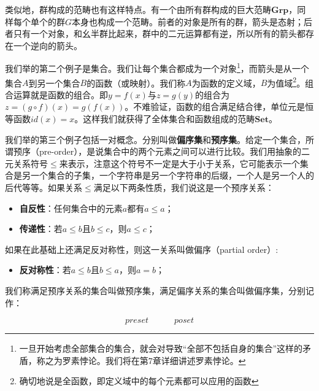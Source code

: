 \documentclass{article}
\begin{document}
类似地，群构成的范畴也有这样特点。有一个由所有群构成的巨大范畴$\pmb{Grp}$，同样每个单个的群$G$本身也构成一个范畴。前者的对象是所有的群，箭头是态射；后者只有一个对象，和幺半群比起来，群中的二元运算都有逆，所以所有的箭头都存在一个逆向的箭头。

我们举的第二个例子是集合。我们让每个集合都成为一个对象\footnote{一旦开始考虑全部集合的集合，就会对导致“全部不包括自身的集合”这样的矛盾，称之为罗素悖论。我们将在第7章详细讲述罗素悖论。}，而箭头是从一个集合$A$到另一个集合$B$的函数（或映射）。我们称$A$为函数的定义域，$B$为值域\footnote{确切地说是全函数，即定义域中的每个元素都可以应用的函数}。组合运算就是函数的组合。即$y = f(x)$与$z = g(y)$的组合为$z = (g \circ f)(x) = g(f(x))$。不难验证，函数的组合满足结合律，单位元是恒等函数$id(x) = x$。这样我们就获得了全体集合和函数组成的范畴$\pmb{Set}$。

我们举的第三个例子包括一对概念。分别叫做\textbf{偏序集}和\textbf{预序集}。给定一个集合，所谓预序（pre-order），是说集合中的两个元素之间可以进行比较。我们用抽象的二元关系符号$\leq$来表示，注意这个符号不一定是大于小于关系，它可能表示一个集合是另一个集合的子集，一个字符串是另一个字符串的后缀，一个人是另一个人的后代等等。如果关系$\leq$满足以下两条性质，我们说这是一个预序关系：

\begin{itemize}
\item \textbf{自反性}：任何集合中的元素$a$都有$a \leq a$；
\item \textbf{传递性}：若$a \leq b$且$b \leq c$，则$a \leq c$；
\end{itemize}

如果在此基础上还满足反对称性，则这一关系叫做偏序（partial order）:

\begin{itemize}
\item \textbf{反对称性}：若$a \leq b$且$b \leq a$，则$a = b$；
\end{itemize}

我们称满足预序关系的集合叫做预序集，满足偏序关系的集合叫做偏序集，分别记作：

\[
preset \quad \quad \quad poset
\]
\end{document}
